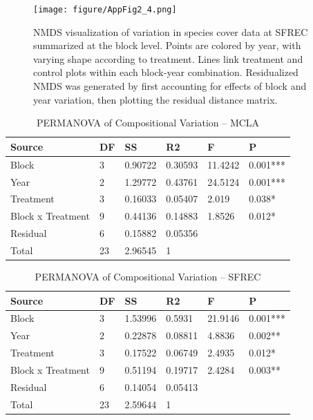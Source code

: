 \documentclass[twoside,12pt,final]{ucthesis-CA2012}
\begin{document}
\begin{ucmainmatter}
\begin{figure}
\centering
\texttt{[image: figure/AppFig2\_4.png]}
\caption{NMDS visualization of variation in species cover data at SFREC summarized at the block level. Points are colored by year, with varying shape according to treatment. Lines link treatment and control plots within each block-year combination. Residualized NMDS was generated by first accounting for effects of block and year variation, then plotting the residual distance matrix. \label{app-2-4}}
\end{figure}
\begin{table}[ht]
\centering
\begin{tabular}{llllll}
  \hline
Source & DF & SS & R2 & F & P \\ 
  \hline
Block & 3 & 0.90722 & 0.30593 & 11.4242 & 0.001*** \\ 
  Year & 2 & 1.29772 & 0.43761 & 24.5124 & 0.001*** \\ 
  Treatment & 3 & 0.16033 & 0.05407 & 2.019 & 0.038* \\ 
  Block x Treatment & 9 & 0.44136 & 0.14883 & 1.8526 & 0.012* \\ 
  Residual & 6 & 0.15882 & 0.05356 &  &  \\ 
  Total & 23 & 2.96545 & 1 &  &  \\ 
   \hline
\end{tabular}
\caption{PERMANOVA of Compositional Variation -- MCLA} 
\end{table}
\begin{table}[ht]
\centering
\begin{tabular}{llllll}
  \hline
Source & DF & SS & R2 & F & P \\ 
  \hline
Block & 3 & 1.53996 & 0.5931 & 21.9146 & 0.001*** \\ 
  Year & 2 & 0.22878 & 0.08811 & 4.8836 & 0.002** \\ 
  Treatment & 3 & 0.17522 & 0.06749 & 2.4935 & 0.012* \\ 
  Block x Treatment & 9 & 0.51194 & 0.19717 & 2.4284 & 0.003** \\ 
  Residual & 6 & 0.14054 & 0.05413 &  &  \\ 
  Total & 23 & 2.59644 & 1 &  &  \\ 
   \hline
\end{tabular}
\caption{PERMANOVA of Compositional Variation -- SFREC} 
\end{table}
\begin{table}[ht]
\centering
{}
\end{table}
\end{ucmainmatter}
\end{document}
